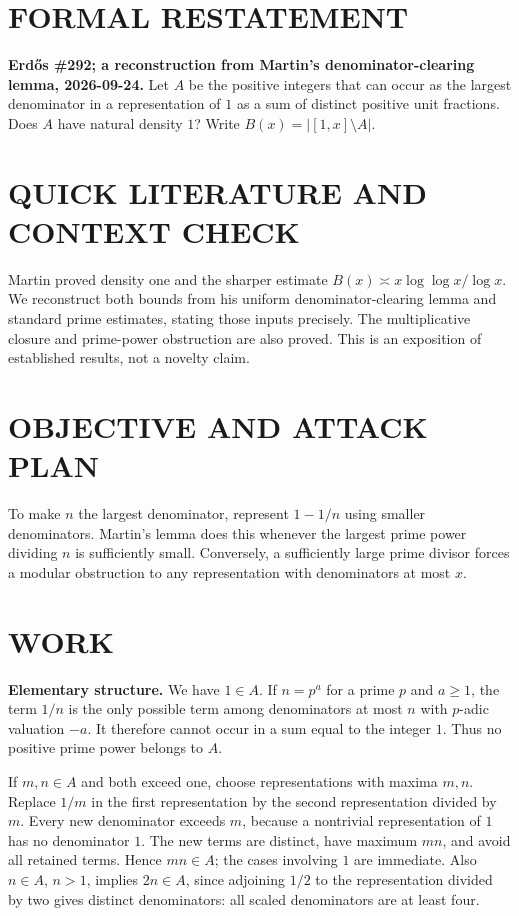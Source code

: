 \section{FORMAL RESTATEMENT}
\textbf{Erd\H{o}s \#292; a reconstruction from Martin's denominator-clearing lemma, 2026-09-24.}
Let $A$ be the positive integers that can occur as the largest denominator in a representation of $1$ as a sum of distinct positive unit fractions. Does $A$ have natural density $1$? Write $B(x)=|[1,x]\setminus A|$.

\section{QUICK LITERATURE AND CONTEXT CHECK}
Martin proved density one and the sharper estimate $B(x)\asymp x\log\log x/\log x$. We reconstruct both bounds from his uniform denominator-clearing lemma and standard prime estimates, stating those inputs precisely. The multiplicative closure and prime-power obstruction are also proved. This is an exposition of established results, not a novelty claim.

\section{OBJECTIVE AND ATTACK PLAN}
To make $n$ the largest denominator, represent $1-1/n$ using smaller denominators. Martin's lemma does this whenever the largest prime power dividing $n$ is sufficiently small. Conversely, a sufficiently large prime divisor forces a modular obstruction to any representation with denominators at most $x$.

\section{WORK}
\textbf{Elementary structure.} We have $1\in A$. If $n=p^a$ for a prime $p$ and $a\geq1$, the term $1/n$ is the only possible term among denominators at most $n$ with $p$-adic valuation $-a$. It therefore cannot occur in a sum equal to the integer $1$. Thus no positive prime power belongs to $A$.

If $m,n\in A$ and both exceed one, choose representations with maxima $m,n$. Replace $1/m$ in the first representation by the second representation divided by $m$. Every new denominator exceeds $m$, because a nontrivial representation of $1$ has no denominator $1$. The new terms are distinct, have maximum $mn$, and avoid all retained terms. Hence $mn\in A$; the cases involving $1$ are immediate. Also $n\in A$, $n>1$, implies $2n\in A$, since adjoining $1/2$ to the representation divided by two gives distinct denominators: all scaled denominators are at least four.

